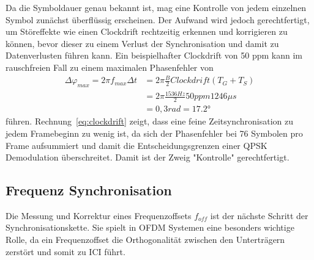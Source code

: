 Da die Symboldauer genau bekannt ist, mag eine Kontrolle von jedem einzelnen Symbol zunächst überflüssig erscheinen. Der Aufwand wird jedoch gerechtfertigt, um Störeffekte wie einen Clockdrift rechtzeitig erkennen und korrigieren zu können, bevor dieser zu einem Verlust der Synchronisation und damit zu Datenverlusten führen kann.
Ein beispielhafter Clockdrift von 50 ppm kann im rauschfreien Fall zu einem maximalen Phasenfehler von
\begin{equation}
\begin{aligned}
    \Delta\varphi_{max} = 2 \pi f_{max} \Delta t &= 2 \pi \frac{B}{2} Clockdrift (T_G+T_S) \\
    &=  2 \pi \frac{1536 Hz}{2} 50ppm 1246\mu s \\
    &= 0,3 rad = \ang{17,2}
    \end{aligned}
    \label{eq:clockdrift}
\end{equation}
führen. Rechnung~\ref{eq:clockdrift} zeigt, dass eine feine Zeitsynchronisation zu jedem Framebeginn zu wenig ist, da sich der Phasenfehler bei 76 Symbolen pro Frame aufsummiert und damit die Entscheidungsgrenzen einer QPSK Demodulation überschreitet. Damit ist der Zweig "Kontrolle" gerechtfertigt.


\subsection{Frequenz Synchronisation}
Die Messung und Korrektur eines Frequenzoffsets $f_{off}$ ist der nächste Schritt der Synchronisationskette. Sie spielt in OFDM Systemen eine besonders wichtige Rolle, da ein Frequenzoffset die Orthogonalität zwischen den Unterträgern zerstört und somit zu \ac{ICI} führt.

